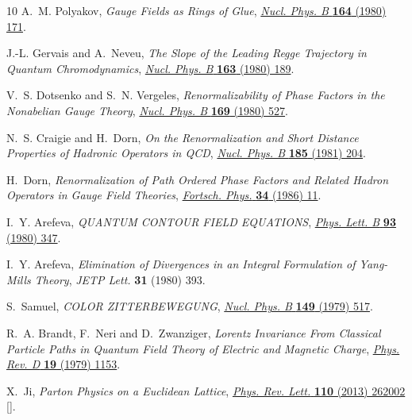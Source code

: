 \begingroup\raggedright
\begin{thebibliography}{10}
A.~M. Polyakov, \emph{{Gauge Fields as Rings of Glue}},
  \href{https://doi.org/10.1016/0550-3213(80)90507-6}{\emph{Nucl. Phys. B}
  {\bfseries 164} (1980) 171}.

J.-L. Gervais and A.~Neveu, \emph{{The Slope of the Leading Regge Trajectory in
  Quantum Chromodynamics}},
  \href{https://doi.org/10.1016/0550-3213(80)90397-1}{\emph{Nucl. Phys. B}
  {\bfseries 163} (1980) 189}.

V.~S. Dotsenko and S.~N. Vergeles, \emph{{Renormalizability of Phase Factors in
  the Nonabelian Gauge Theory}},
  \href{https://doi.org/10.1016/0550-3213(80)90103-0}{\emph{Nucl. Phys. B}
  {\bfseries 169} (1980) 527}.

N.~S. Craigie and H.~Dorn, \emph{{On the Renormalization and Short Distance
  Properties of Hadronic Operators in {QCD}}},
  \href{https://doi.org/10.1016/0550-3213(81)90372-2}{\emph{Nucl. Phys. B}
  {\bfseries 185} (1981) 204}.

H.~Dorn, \emph{{Renormalization of Path Ordered Phase Factors and Related
  Hadron Operators in Gauge Field Theories}},
  \href{https://doi.org/10.1002/prop.19860340104}{\emph{Fortsch. Phys.}
  {\bfseries 34} (1986) 11}.

I.~Y. Arefeva, \emph{{QUANTUM CONTOUR FIELD EQUATIONS}},
  \href{https://doi.org/10.1016/0370-2693(80)90529-8}{\emph{Phys. Lett. B}
  {\bfseries 93} (1980) 347}.

I.~Y. Arefeva, \emph{{Elimination of Divergences in an Integral Formulation of
  {Yang-Mills} Theory}}, {\emph{JETP Lett.} {\bfseries 31} (1980) 393}.

S.~Samuel, \emph{{COLOR ZITTERBEWEGUNG}},
  \href{https://doi.org/10.1016/0550-3213(79)90005-1}{\emph{Nucl. Phys. B}
  {\bfseries 149} (1979) 517}.

R.~A. Brandt, F.~Neri and D.~Zwanziger, \emph{{Lorentz Invariance From
  Classical Particle Paths in Quantum Field Theory of Electric and Magnetic
  Charge}}, \href{https://doi.org/10.1103/PhysRevD.19.1153}{\emph{Phys. Rev. D}
  {\bfseries 19} (1979) 1153}.

X.~Ji, \emph{{Parton Physics on a Euclidean Lattice}},
  \href{https://doi.org/10.1103/PhysRevLett.110.262002}{\emph{Phys. Rev. Lett.}
  {\bfseries 110} (2013) 262002}
  [\href{https://arxiv.org/abs/1305.1539}{{}}].


\end{thebibliography}
